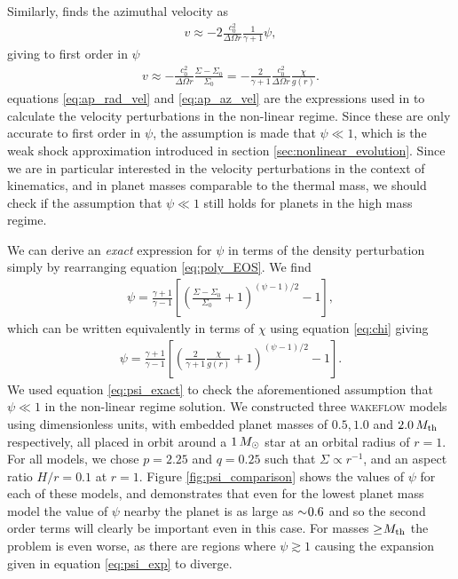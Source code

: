 Similarly, \citet{rafikov2002a} finds the azimuthal velocity as
\begin{align}
    v \approx -2 \frac{c_0^2}{\Delta\Omega r} \frac{1}{\gamma + 1} \psi, \label{eq:v_rafikov}
\end{align}
giving to first order in $\psi$
\begin{align}
    v \approx - \frac{c_0^2}{\Delta \Omega r} \frac{\Sigma - \Sigma_0}{\Sigma_0} = - \frac{2}{\gamma + 1} \frac{c_0^2}{\Delta \Omega r} \frac{\chi}{g(r)}. \label{eq:ap_az_vel}
\end{align}
equations \ref{eq:ap_rad_vel} and \ref{eq:ap_az_vel} are the expressions used in \citet{bollati2021} to calculate the velocity perturbations in the non-linear regime. 
Since these are only accurate to first order in $\psi$, the assumption is made that $\psi \ll 1$, which is the weak shock approximation introduced in section \ref{sec:nonlinear_evolution}.
Since we are in particular interested in the velocity perturbations in the context of kinematics, and in planet masses comparable to the thermal mass, we should check if the assumption that $\psi \ll 1$ still holds for planets in the high mass regime.

We can derive an \textit{exact} expression for $\psi$ in terms of the density perturbation simply by rearranging equation \ref{eq:poly_EOS}. We find
\begin{align}
    \psi = \frac{\gamma + 1}{\gamma - 1} \left[ \left( \frac{\Sigma-\Sigma_0}{\Sigma_0} +1  \right)^{(\psi-1)/2}  -1 \right],
\end{align}
which can be written equivalently in terms of $\chi$ using equation \ref{eq:chi} giving
\begin{align}
    \psi = \frac{\gamma + 1}{\gamma - 1} \left[ \left( \frac{2}{\gamma + 1} \frac{\chi}{g(r)} +1  \right)^{(\psi-1)/2} -1 \right]. \label{eq:psi_exact}
\end{align}
We used equation \ref{eq:psi_exact} to check the aforementioned assumption that $\psi \ll 1$ in the non-linear regime solution. 
We constructed three \textsc{wakeflow} models using dimensionless units, with embedded planet masses of $0.5, 1.0$ and $2.0 \, M_{\rm{th}}$ respectively, all placed in orbit around a $1 \, M_{\rm{\odot}}$ star at an orbital radius of $r=1$. 
For all models, we chose $p=2.25$ and $q=0.25$ such that $\Sigma \propto r^{-1}$, and an aspect ratio $H/r=0.1$ at $r=1$. 
Figure \ref{fig:psi_comparison} shows the values of $\psi$ for each of these models, and demonstrates that even for the lowest planet mass model the value of $\psi$ nearby the planet is as large as $\sim \hspace{-0.23em} 0.6$ and so the second order terms will clearly be important even in this case. 
For masses $\ge \hspace{-0.23em} M_\mathrm{th}$ the problem is even worse, as there are regions where $\psi \gtrsim 1$ causing the expansion given in equation \ref{eq:psi_exp} to diverge.

